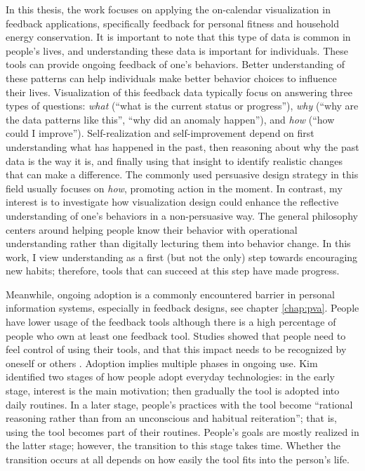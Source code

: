 \documentclass[12pt,oneside]{book}
\begin{document}
In this thesis, the work focuses on applying the on-calendar visualization in feedback applications, specifically feedback for personal fitness and household energy conservation.  It is important to note that this type of data is common in people's lives, and understanding these data is important for individuals.  These tools can provide ongoing feedback of one's behaviors.  Better understanding of these patterns can help individuals make better behavior choices to influence their lives.  Visualization of this feedback data typically focus on answering three types of questions: \textit{what} (``what is the current status or progress''), \textit{why} (``why are the data patterns like this'', ``why did an anomaly happen''), and \textit{how} (``how could I improve'').  Self-realization and self-improvement depend on first understanding what has happened in the past, then reasoning about why the past data is the way it is, and finally using that insight to identify realistic changes that can make a difference.  The commonly used persuasive design strategy in this field usually focuses on \textit{how}, promoting action in the moment.  In contrast, my interest is to investigate how visualization design could enhance the reflective understanding of one's behaviors in a non-persuasive way. The general philosophy centers around helping people know their behavior with operational understanding \cite{bartram_design_2015} rather than digitally lecturing them into behavior change.  In this work, I view understanding as a first (but not the only) step towards encouraging new habits; therefore, tools that can succeed at this step have made progress.

Meanwhile, ongoing adoption is a commonly encountered barrier in personal information systems, especially in feedback designs, see chapter \ref{chap:pva}.  People have lower usage of the feedback tools although there is a high percentage of people who own at least one feedback tool.  Studies showed that people need to feel control of using their tools, and that this impact needs to be recognized by oneself or others \cite{ahtinen_user_2009}.  Adoption implies multiple phases in ongoing use.  Kim\cite{kim_inair:_2010} identified two stages of how people adopt everyday technologies: in the early stage, interest is the main motivation; then gradually the tool is adopted into daily routines. In a later stage, people's practices with the tool become ``rational reasoning rather than from an unconscious and habitual reiteration''; that is, using the tool becomes part of their routines. People's goals are mostly realized in the latter stage; however, the transition to this stage takes time.  Whether the transition occurs at all depends on how easily the tool fits into the person's life.
\end{document}
